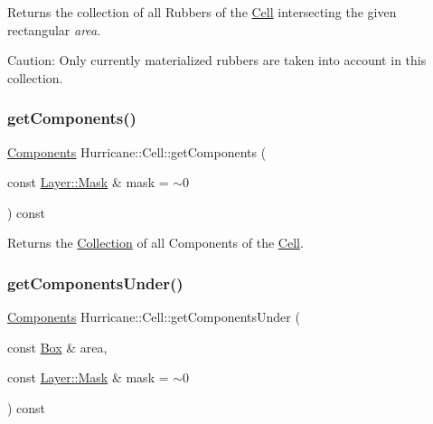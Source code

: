 Returns the collection of all Rubbers of the \mbox{\hyperlink{classHurricane_1_1Cell}{Cell}} intersecting the given rectangular {\itshape area}.

\begin{DoxyParagraph}{Caution\+: Only currently materialized rubbers are taken into account}
in this collection. 
\end{DoxyParagraph}
\mbox{\label{classHurricane_1_1Cell_a14cb1b1f27e75d4af5b34a9a5956d818}} 
\subsubsection{\texorpdfstring{get\+Components()}{getComponents()}}
{\footnotesize\ttfamily \mbox{\hyperlink{namespaceHurricane_a7d26d99aeb5dd6d70d51bd35d2473e72}{Components}} Hurricane\+::\+Cell\+::get\+Components (\begin{DoxyParamCaption}\item[{const \mbox{\hyperlink{classHurricane_1_1Layer_af5277c670637bd5d910237e7afe01a91}{Layer\+::\+Mask}} \&}]{mask = {\ttfamily $\sim$0} }\end{DoxyParamCaption}) const}

Returns the \mbox{\hyperlink{classHurricane_1_1Collection}{Collection}} of all Components of the \mbox{\hyperlink{classHurricane_1_1Cell}{Cell}}. \mbox{\label{classHurricane_1_1Cell_a0a3c54d755ab36fe74bd032dfd43b53a}} 
\subsubsection{\texorpdfstring{get\+Components\+Under()}{getComponentsUnder()}}
{\footnotesize\ttfamily \mbox{\hyperlink{namespaceHurricane_a7d26d99aeb5dd6d70d51bd35d2473e72}{Components}} Hurricane\+::\+Cell\+::get\+Components\+Under (\begin{DoxyParamCaption}\item[{const \mbox{\hyperlink{classHurricane_1_1Box}{Box}} \&}]{area,  }\item[{const \mbox{\hyperlink{classHurricane_1_1Layer_af5277c670637bd5d910237e7afe01a91}{Layer\+::\+Mask}} \&}]{mask = {\ttfamily $\sim$0} }\end{DoxyParamCaption}) const}

